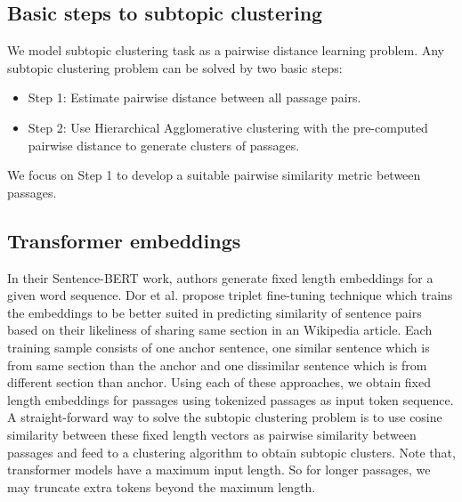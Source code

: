 \documentclass[sigconf,authordraft]{acmart}
\begin{document}
\subsection{Basic steps to subtopic clustering} We model subtopic clustering task as a pairwise distance learning problem. Any subtopic clustering problem can be solved by two basic steps:
\begin{itemize}
    \item Step 1: Estimate pairwise distance between all passage pairs.
    \item Step 2: Use Hierarchical Agglomerative clustering with the pre-computed pairwise distance to generate clusters of passages.
\end{itemize}

We focus on Step 1 to develop a suitable pairwise similarity metric between passages.

\subsection{Transformer embeddings} In their Sentence-BERT work, authors generate fixed length embeddings for a given word sequence. Dor et al. \cite{dor2018learning} propose triplet fine-tuning technique which trains the embeddings to be better suited in predicting similarity of sentence pairs based on their likeliness of sharing same section in an Wikipedia article. Each training sample consists of one anchor sentence, one similar sentence which is from same section than the anchor and one dissimilar sentence which is from different section than anchor. Using each of these approaches, we obtain fixed length embeddings for passages using tokenized passages as input token sequence. A straight-forward way to solve the subtopic clustering problem is to use cosine similarity between these fixed length vectors as pairwise similarity between passages and feed to a clustering algorithm to obtain subtopic clusters. Note that, transformer models have a maximum input length. So for longer passages, we may truncate extra tokens beyond the maximum length. 
\end{document}
